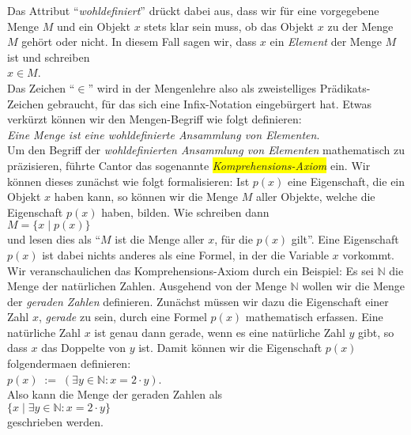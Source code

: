 Das Attribut ``\emph{wohldefiniert}'' dr\"{u}ckt dabei aus, dass wir f\"{u}r 
eine vorgegebene Menge $M$ und ein Objekt $x$ stets klar sein muss, ob das Objekt $x$
zu der Menge $M$ geh\"{o}rt oder nicht.  In diesem Fall sagen wir, dass $x$ ein \emph{Element} der
Menge $M$ ist und schreiben
\\[0.2cm]
\hspace*{1.3cm}
$x \in M$. 
\\[0.2cm]
Das Zeichen ``$\in$'' wird in der Mengenlehre also als zweistelliges Pr\"{a}dikats-Zeichen
gebraucht, f\"{u}r das sich eine Infix-Notation eingeb\"{u}rgert hat.
Etwas verk\"{u}rzt k\"{o}nnen wir den Mengen-Begriff wie folgt definieren: 
\\[0.2cm]
\hspace*{1.3cm}
\textsl{Eine Menge ist eine \emph{wohldefinierte} Ansammlung von Elementen}.
\\[0.2cm]
Um den Begriff der \emph{wohldefinierten Ansammlung von Elementen} mathematisch zu
pr\"{a}zisieren, f\"{u}hrte Cantor das sogenannte \colorbox{yellow}{\emph{Komprehensions-Axiom}} ein.
Wir k\"{o}nnen dieses zun\"{a}chst wie folgt formalisieren: Ist $p(x)$ eine Eigenschaft, die
ein Objekt $x$ haben kann, so k\"{o}nnen wir die Menge $M$ aller Objekte, welche die
Eigenschaft $p(x)$ haben, bilden.  Wie schreiben dann \\[0.2cm]
\hspace*{1.3cm} $M = \{ x \;|\; p(x) \}$ \\[0.2cm]
und lesen dies als ``$M$ ist die Menge aller $x$, f\"{u}r die $p(x)$ gilt''.
Eine Eigenschaft $p(x)$ ist dabei nichts anderes als eine Formel, in der die Variable $x$
vorkommt.
Wir veranschaulichen das Komprehensions-Axiom durch ein Beispiel:  Es sei $\mathbb{N}$
die Menge der nat\"{u}rlichen Zahlen. Ausgehend von der Menge $\mathbb{N}$  wollen wir die
Menge der \emph{geraden Zahlen} definieren. Zun\"{a}chst m\"{u}ssen wir dazu die Eigenschaft einer
Zahl $x$,
\emph{gerade} zu sein, durch eine Formel $p(x)$ mathematisch erfassen.  Eine nat\"{u}rliche Zahl $x$ ist
genau dann gerade, wenn es eine nat\"{u}rliche Zahl $y$ gibt, so dass $x$ das Doppelte von $y$
ist.  Damit k\"{o}nnen wir die Eigenschaft $p(x)$ folgenderma\3en
definieren: \\[0.2cm]
\hspace*{1.3cm} $p(x) \;:=\; (\exists y\in \mathbb{N}: x = 2 \cdot y)$. \\[0.2cm]
Also kann die Menge der geraden Zahlen als \\[0.2cm]
\hspace*{1.3cm} $\{ x \;|\; \exists y\in \mathbb{N}: x = 2 \cdot y \}$ \\[0.2cm]
geschrieben werden.

